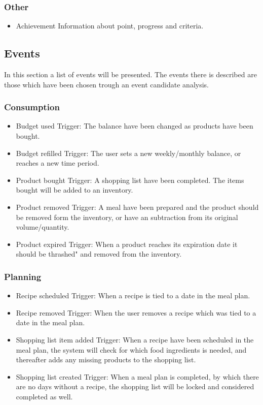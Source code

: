 \subsubsection{Other}
\begin{itemize}
\item Achievement
    \subitem Information about point, progress and criteria.
\end{itemize}

\subsection{Events}
In this section a list of events will be presented. The events there is described are those which have been chosen trough an event candidate analysis.
\subsubsection{Consumption}
\begin{itemize}
\item Budget used
    \subitem Trigger: The balance have been changed as products have been bought.
\item Budget refilled
    \subitem Trigger: The user sets a new weekly/monthly balance, or reaches a new time period.
\item Product bought
    \subitem Trigger: A shopping list have been completed. The items bought will be added to an inventory.
\item Product removed
    \subitem Trigger: A meal have been prepared and the product should be removed form the inventory, or have an subtraction from its original volume/quantity.
\item Product expired
    \subitem Trigger: When a product reaches its expiration date it should be thrashed" and removed from the inventory.
\end{itemize}

\subsubsection{Planning}
\begin{itemize}
    \item Recipe scheduled
        \subitem Trigger: When a recipe is tied to a date in the meal plan.
    \item Recipe removed
        \subitem Trigger: When the user removes a recipe which was tied to a date in the meal plan.
    \item Shopping list item added
        \subitem Trigger: When a recipe have been scheduled in the meal plan, the system will check for which food ingredients is needed, and thereafter adds any missing products to the shopping list.
    \item Shopping list created
        \subitem Trigger: When a meal plan is completed, by which there are no days without a recipe, the shopping list will be locked and considered completed as well.
\end{itemize}

